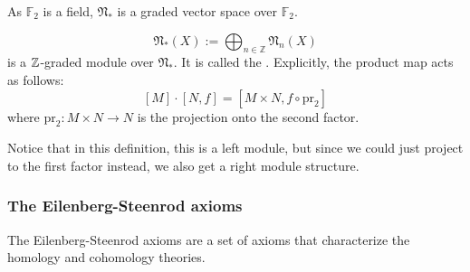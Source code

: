 \documentclass[a4paper,11pt]{article}
\begin{document}
\begin{remark}
    As \(\mathbb{F}_2\) is a field, \(\mathfrak{N}_\ast\) is a graded vector space over \(\mathbb{F}_2\).
\end{remark}


\begin{definition}
    \[\mathfrak{N}_\ast(X):=\bigoplus_{n\in\mathbb{Z}}\mathfrak{N}_n(X)\]
    is a \(\mathbb{Z}\)-graded module over \(\mathfrak{N}_\ast\). It is called the . Explicitly, the product map acts as follows:
    \[[M]\cdot[N,f]=[M\times N, f\circ \mathrm{pr}_2]\]
    where \(\mathrm{pr}_2:M\times N\to N\) is the projection onto the second factor.
\end{definition}

\begin{remark}
    Notice that in this definition, this is a left module, but since we could just project to the first factor instead, we also get a right module structure.
\end{remark}

\subsubsection{The Eilenberg-Steenrod axioms}\label{es axioms}
The Eilenberg-Steenrod axioms are a set of axioms that characterize the homology and cohomology theories.
\end{document}
